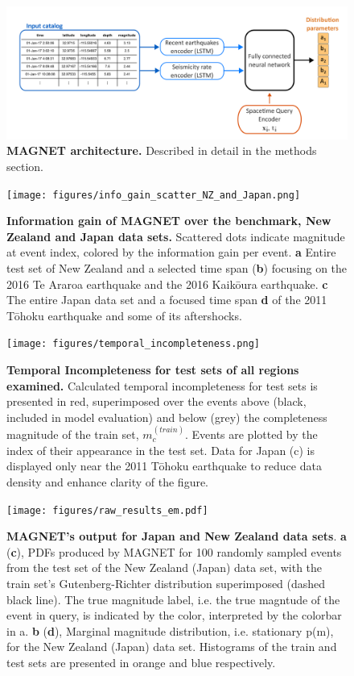 \documentclass[pdflatex]{sn-jnl}
\begin{document}
\newpage
\begin{figure}[h!]
    \centering
    \includegraphics[width=1\textwidth]{figures/detailed_architecture.png}
    \caption{\textbf{MAGNET architecture.} Described in detail in the methods section.}
    \label{fig:architecture}
\end{figure}

\newpage
\begin{figure}[h!]
	\centering
        \texttt{[image: figures/info\_gain\_scatter\_NZ\_and\_Japan.png]}
	\caption{
            \textbf{Information gain of MAGNET over the benchmark, New Zealand and Japan data sets.} Scattered dots indicate magnitude at event index, colored by the information gain per event. \textbf{a} Entire test set of New Zealand and a selected time span (\textbf{b}) focusing on the 2016 Te Araroa earthquake and the 2016 Kaikōura earthquake. \textbf{c} The entire Japan data set and a focused time span \textbf{d} of the 2011 Tōhoku earthquake and some of its aftershocks. 
         }
\label{fig:nz_japan_info_gain}
\end{figure}

\newpage
\begin{figure}[h!]
    \centering
        \texttt{[image: figures/temporal\_incompleteness.png]}
    \caption{
    \textbf{Temporal Incompleteness for test sets of all regions examined.} Calculated temporal incompleteness for test sets is presented in red, superimposed over the events above (black, included in model evaluation) and below (grey) the completeness magnitude of the train set, $m_c^{(train)}$. Events are plotted by the index of their appearance in the test set. Data for Japan (c) is displayed only near the 2011 Tōhoku earthquake to reduce data density and enhance clarity of the figure.
    }
    \label{fig:temp_incompleteness}
\end{figure}

\newpage
\begin{figure}[h!]
    \centering
    \texttt{[image: figures/raw\_results\_em.pdf]}
    \caption{
        \textbf{MAGNET’s output for Japan and New Zealand data sets}. \textbf{a} (\textbf{c}), PDFs produced by MAGNET for 100 randomly sampled events from the test set of the New Zealand (Japan) data set, with the train set’s Gutenberg-Richter distribution superimposed (dashed black line). The true magnitude label, i.e. the true magntude of the event in query, is indicated by the color, interpreted by the colorbar in a. \textbf{b} (\textbf{d}), Marginal magnitude distribution, i.e. stationary p(m), for the New Zealand (Japan) data set. Histograms of the train and test sets are presented in orange and blue respectively.
    }
    \label{fig:model_output_em}
\end{figure}
\end{document}
